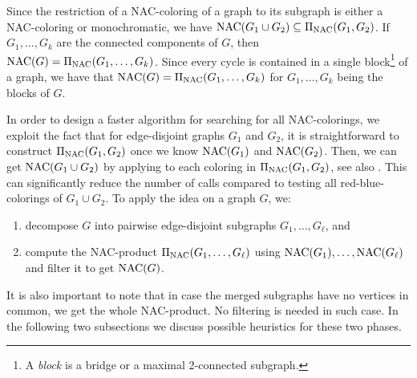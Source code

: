
Since the restriction of a NAC-coloring of a graph
to its subgraph is either a NAC-coloring or monochromatic,
we have $\operatorname{NAC}(G_{1} \cup G_{2}) \subseteq \operatorname{\Pi_{\operatorname{NAC}}}(G_{1}, G_{2})$.
If $G_1, \dots, G_k$ are the connected components of $G$,
then $\operatorname{NAC}(G) = \operatorname{\Pi_{\operatorname{NAC}}}(G_1,\ldots, G_k)$.
Since every cycle is contained in a single
block\footnote{A \emph{block} is a bridge or a maximal 2-connected subgraph.}
of a graph, we have that $\operatorname{NAC}(G) = \operatorname{\Pi_{\operatorname{NAC}}}(G_1,\ldots, G_k)$
for $G_1,\ldots, G_k$ being the blocks of $G$.

In order to design a faster algorithm for searching for all NAC-colorings,
we exploit the fact that for edge-disjoint graphs $G_1$ and $G_2$,
it is straightforward to construct $\operatorname{\Pi_{\operatorname{NAC}}}(G_{1}, G_{2})$ once we know $\operatorname{NAC}(G_1)$ and $\operatorname{NAC}(G_2)$.
Then, we can get $\operatorname{NAC}(G_{1} \cup G_{2})$ by applying \IsNACColoring{}
to each coloring in $\operatorname{\Pi_{\operatorname{NAC}}}(G_{1}, G_{2})$, see also .
This can significantly reduce the number of \IsNACColoring{} calls
compared to testing all red-blue-colorings of $G_{1} \cup G_{2}$.
To apply the idea on a graph $G$, we:
%
\begin{enumerate}
	\item decompose $G$ into pairwise edge-disjoint subgraphs $G_1, \ldots, G_\ell$, and
	\item compute the NAC-product $\operatorname{\Pi_{\operatorname{NAC}}}(G_1, \dots, G_\ell)$ using $\operatorname{NAC}(G_1), \ldots, \operatorname{NAC}(G_\ell)$
	      and filter it to get $\operatorname{NAC}(G)$.
\end{enumerate}
%
It is also important to note that in case the merged subgraphs
have no vertices in common, we get the whole NAC-product.
No filtering is needed in such case.
%
In the following two subsections we discuss possible heuristics
for these two phases.

